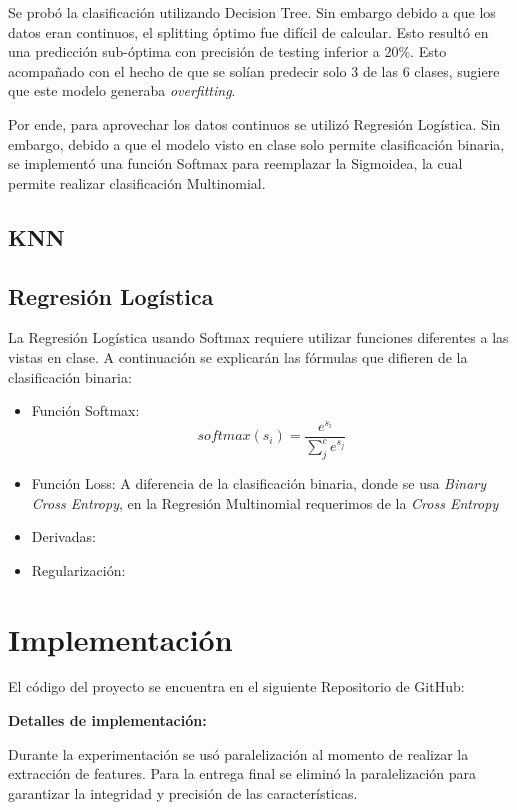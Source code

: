 \documentclass[conference]{IEEEtran}
\begin{document}
Se probó la clasificación utilizando Decision Tree. Sin embargo debido a que los datos eran continuos, el splitting óptimo fue difícil de calcular. Esto resultó en una predicción sub-óptima con precisión de testing inferior a 20\%. Esto acompañado con el hecho de que se solían predecir solo 3 de las 6 clases, sugiere que este modelo generaba \textit{overfitting}.

Por ende, para aprovechar los datos continuos se utilizó Regresión Logística. Sin embargo, debido a que el modelo visto en clase solo permite clasificación binaria, se implementó una función Softmax para reemplazar la Sigmoidea, la cual permite realizar clasificación Multinomial.

\subsection{KNN}
\subsection{Regresión Logística}
La Regresión Logística usando Softmax requiere utilizar funciones diferentes a las vistas en clase. A continuación se explicarán las fórmulas que difieren de la clasificación binaria:
\begin{itemize}
\item Función Softmax:
$$softmax(s_i) = \frac{e^{s_i}}{\sum_j^c e^{s_j}}$$

\item Función Loss:
A diferencia de la clasificación binaria, donde se usa \textit{Binary Cross Entropy}, en la Regresión Multinomial requerimos de la \textit{Cross Entropy}
\item Derivadas:
\item Regularización:
\end{itemize}


\section{Implementación}
El código del proyecto se encuentra en el siguiente Repositorio de GitHub:


\textbf{Detalles de implementación:}

Durante la experimentación se usó paralelización al momento de realizar la extracción de features. Para la entrega final se eliminó la paralelización para garantizar la integridad y precisión de las características.
\end{document}
